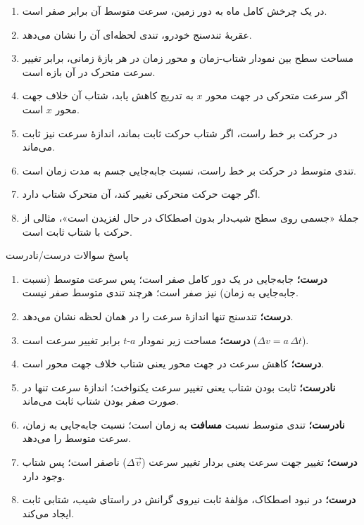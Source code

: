 \documentclass[12pt, a4paper]{article}
\begin{document}
\begin{enumerate}
    \item در یک چرخش کامل ماه به دور زمین، سرعت متوسط آن برابر صفر است. 
    \item عقربهٔ تندسنج خودرو، تندی لحظه‌ای آن را نشان می‌دهد. 
    \item مساحت سطح بین نمودار شتاب-زمان و محور زمان در هر بازهٔ زمانی، برابر تغییر سرعت متحرک در آن بازه است. 
    \item اگر سرعت متحرکی در جهت محور $x$ به تدریج کاهش یابد، شتاب آن خلاف جهت محور $x$ است. 
    \item در حرکت بر خط راست، اگر شتاب حرکت ثابت بماند، اندازهٔ سرعت نیز ثابت می‌ماند. 
    \item تندی متوسط در حرکت بر خط راست، نسبت جابه‌جایی جسم به مدت زمان است. 
    \item اگر جهت حرکت متحرکی تغییر کند، آن متحرک شتاب دارد. 
    \item جملهٔ «جسمی روی سطح شیب‌دار بدون اصطکاک در حال لغزیدن است»، مثالی از حرکت با شتاب ثابت است. 
\end{enumerate}

\begin{answerbox}{پاسخ سوالات درست/نادرست}
\begin{enumerate}
    \item \textbf{درست؛} جابه‌جایی در یک دور کامل صفر است؛ پس سرعت متوسط (نسبت جابه‌جایی به زمان) نیز صفر است؛ هرچند تندی متوسط صفر نیست.
    \item \textbf{درست؛} تندسنج تنها اندازهٔ سرعت را در همان لحظه نشان می‌دهد.
    \item \textbf{درست؛} مساحت زیر نمودار $a$-$t$ برابر تغییر سرعت است ($\Delta v = a\,\Delta t$).
    \item \textbf{درست؛} کاهش سرعت در جهت محور یعنی شتاب خلاف جهت محور است.
    \item \textbf{نادرست؛} ثابت بودن شتاب یعنی تغییر سرعت یکنواخت؛ اندازهٔ سرعت تنها در صورت صفر بودن شتاب ثابت می‌ماند.
    \item \textbf{نادرست؛} تندی متوسط نسبت \textbf{مسافت} به زمان است؛ نسبت جابه‌جایی به زمان، سرعت متوسط را می‌دهد.
    \item \textbf{درست؛} تغییر جهت سرعت یعنی بردار تغییر سرعت ($\Delta\vec{v}$) ناصفر است؛ پس شتاب وجود دارد.
    \item \textbf{درست؛} در نبود اصطکاک، مؤلفهٔ ثابت نیروی گرانش در راستای شیب، شتابی ثابت ایجاد می‌کند.
\end{enumerate}
\end{answerbox}
\end{document}
